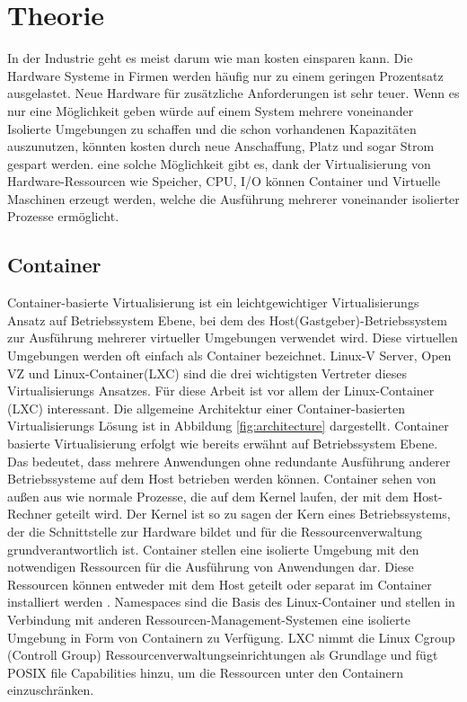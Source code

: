 \thispagestyle{empty}

\section{Theorie}

In der Industrie geht es meist darum wie man kosten einsparen kann. Die Hardware Systeme in Firmen werden häufig nur zu einem geringen Prozentsatz ausgelastet. Neue Hardware für zusätzliche Anforderungen ist sehr teuer. Wenn es nur eine Möglichkeit geben würde auf einem System mehrere voneinander Isolierte Umgebungen zu schaffen und die schon vorhandenen Kapazitäten auszunutzen, könnten kosten durch neue Anschaffung, Platz und sogar Strom gespart werden. eine solche Möglichkeit gibt es, dank der Virtualisierung von Hardware-Ressourcen wie Speicher, CPU, I/O können Container und Virtuelle Maschinen erzeugt werden, welche die Ausführung mehrerer voneinander isolierter Prozesse ermöglicht.

\pagebreak

\subsection{Container}
Container-basierte Virtualisierung ist ein leichtgewichtiger Virtualisierungs Ansatz auf Betriebssystem Ebene, bei dem des Host(Gastgeber)-Betriebssystem zur Ausführung mehrerer virtueller Umgebungen verwendet wird. Diese virtuellen Umgebungen werden oft einfach als \glqq Container \grqq{} bezeichnet. Linux-V Server\cite{Overview2018PaperLinux-VServer}, Open VZ\cite{IndexOpenvz.org} und Linux-Container(LXC)\cite{IndexLinuxcontainers.Org} sind die drei wichtigsten Vertreter dieses Virtualisierungs Ansatzes. Für diese Arbeit ist vor allem der Linux-Container (LXC) interessant. Die allgemeine Architektur einer Container-basierten Virtualisierungs Lösung ist in Abbildung \ref{fig:architecture} dargestellt. Container basierte Virtualisierung erfolgt wie bereits erwähnt auf Betriebssystem Ebene. Das bedeutet, dass mehrere Anwendungen ohne redundante Ausführung anderer Betriebssysteme auf dem Host betrieben werden können. Container sehen von außen aus wie normale Prozesse, die auf dem Kernel laufen, der mit dem Host-Rechner geteilt wird. Der Kernel ist so zu sagen der Kern eines Betriebssystems, der die Schnittstelle zur Hardware bildet und für die Ressourcenverwaltung grundverantwortlich ist. Container stellen eine isolierte Umgebung mit den notwendigen Ressourcen für die Ausführung von Anwendungen dar. Diese Ressourcen können entweder mit dem Host geteilt oder separat im Container installiert werden \cite{Xavier2014AClusters}. Namespaces sind die Basis des Linux-Container und stellen in Verbindung mit anderen Ressourcen-Management-Systemen eine isolierte Umgebung in Form von Containern zu Verfügung. LXC nimmt die Linux Cgroup (Controll Group) Ressourcenverwaltungseinrichtungen\cite{Heo2015ControlV2} als Grundlage und fügt POSIX file Capabilities\cite{Overview2018PaperLinux-VServer} hinzu, um die Ressourcen unter den Containern einzuschränken. 




